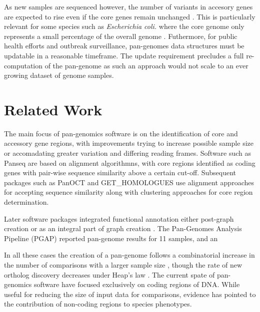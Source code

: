 \documentclass{article}
\begin{document}

As new samples are sequenced however, the number of variants in accesory genes are expected to rise even if the core genes remain unchanged \cite{medini2005microbial}.
This is particularly relevant for some species such as \textit{Escherichia coli.} where the core genome only represents a small percentage of the overall genome \cite{fukiya2004extensive}.
Futhermore, for public health efforts and outbreak surveillance, pan-genomes data structures must be updatable in a reasonable timeframe.
The update requirement precludes a full re-computation of the pan-genome as such an approach would not scale to an ever growing dataset of genome samples.


\enlargethispage{-65.1pt}

\section{Related Work}

The main focus of pan-genomics software is on the identification of core and accessory gene regions, with improvements trying to increase possible sample size or accomadating greater variation and differing reading frames.
Software such as Panseq \cite{laing2010pan} are based on alignment algorithmns, with core regions identified as coding genes with pair-wise sequence similarity above a certain cut-off.
Subsequent packages such as PanOCT \cite{fouts2012panoct} and GET_HOMOLOGUES \cite{contreras2013get_homologues} use alignment approaches for accepting sequence similarity along with clustering approaches for core region determination.

Later software packages integrated functional annotation either post-graph creation \cite{zhao2011pgap} or as an integral part of graph creation \cite{page2015roary}.
The Pan-Genomes Analysis Pipeline (PGAP) \cite{zhao2011pgap} reported pan-genome results for 11 samples, and an 


In all these cases the creation of a pan-genome follows a combinatorial increase in the number of comparisons with a larger sample size \cite{vernikos2015ten}, though the rate of new ortholog discovery decreases under Heap's law \cite{tettelin2008comparative}.
The current spate of pan-genomics software have focused exclusively on coding regions of DNA.
While useful for reducing the size of input data for comparisons, evidence \cite{} has pointed to the contribution of non-coding regions to species phenotypes.
\end{document}
